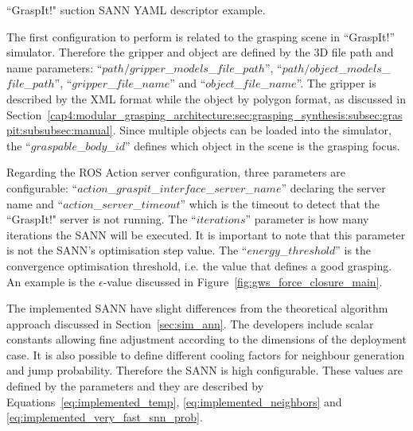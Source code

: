 \begin{snippet}[h!]
\centering
{}
\caption{``GraspIt!" suction \ac{SANN} YAML descriptor example.}
\label{code:suction_sann}
\end{snippet}

The first configuration to perform is related to the grasping scene in ``GraspIt!'' simulator. Therefore the gripper and  object are defined by the 3D file path and name parameters: ``$path/gripper$\_$models$\_$file$\_$path$'', ``$path/object$\_$models$\_$file$\_$path$'', ``$gripper$\_$file$\_$name$'' and ``$object$\_$file$\_$name$''. The gripper is described by the XML format while the object by polygon format, as discussed in Section~\ref{cap4:modular_grasping_architecture:sec:grasping_synthesis:subsec:graspit:subsubsec:manual}. Since multiple objects can be loaded into the simulator, the ``$graspable$\_$body$\_$id$'' defines which object in the scene is the grasping focus.

Regarding the ROS Action server configuration, three parameters are configurable: ``$action$\_$graspit$\_$interface$\_$server$\_$name$'' declaring the server name and ``$action$\_$server$\_$timeout $'' which is the timeout to detect that the  ``GraspIt!" server is not running. The ``$iterations$'' parameter is how many iterations the \ac{SANN} will be executed. It is important to note that this parameter is not the \ac{SANN}'s optimisation step value. The ``$energy$\_$threshold$'' is the convergence optimisation threshold, i.e. the value that defines a good grasping. An example is the $\epsilon$-value discussed in Figure~\ref{fig:gws_force_closure_main}.

The implemented \ac{SANN} have slight differences from the theoretical algorithm approach discussed in Section~\ref{sec:sim_ann}. The developers include scalar constants allowing fine adjustment according to the dimensions of the deployment case. It is also possible to define different cooling factors for neighbour generation and jump probability. Therefore the \ac{SANN} is high configurable. These values are defined by the parameters  and they are described by Equations~\ref{eq:implemented_temp}, \ref{eq:implemented_neighbors} and \ref{eq:implemented_very_fast_snn_prob}.


